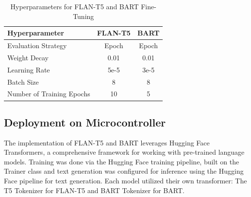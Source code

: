 \documentclass[conference]{IEEEtran}
\begin{document}
\begin{table}[!ht]
    \centering
    \caption{Hyperparameters for FLAN-T5 and BART Fine-Tuning}
    \label{tab:hyperparams}
    \begin{tabular}{l|c|c}
        \toprule
        \textbf{Hyperparameter}         & \textbf{FLAN-T5}         & \textbf{BART} \\
        \midrule
        Evaluation Strategy             & Epoch                   & Epoch                     \\ 
        Weight Decay                    & 0.01                    & 0.01                      \\ 
        Learning Rate                   & 5e-5                    & 3e-5                      \\ 
        Batch Size                      & 8                       & 8                         \\ 
        Number of Training Epochs       & 10                      & 5                         \\ 
        \bottomrule
    \end{tabular}
\end{table}

\subsection{Deployment on Microcontroller}
The implementation of FLAN-T5 and BART leverages Hugging Face Transformers, a comprehensive framework for working with pre-trained language models.
Training was done via the Hugging Face training pipeline, built on the Trainer class and text generation was configured for inference using the Hugging Face pipeline for text generation.
Each model utilized their own transformer: The T5 Tokenizer \cite{b10} for FLAN-T5 and BART Tokenizer \cite{b11} for BART.


\end{document}
